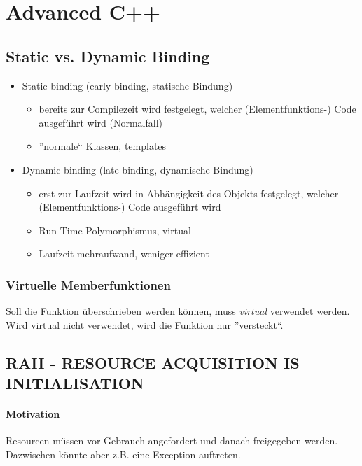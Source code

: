 \section{Advanced C++}

\subsection{Static vs. Dynamic Binding}
\begin{itemize}
	\item Static binding (early binding, statische Bindung)
		\begin{itemize}
			\item bereits zur Compilezeit wird festgelegt, welcher (Elementfunktions-) Code
				ausgeführt wird (Normalfall)
			\item ''normale`` Klassen, templates
		\end{itemize}
	\item Dynamic binding (late binding, dynamische Bindung)
		\begin{itemize}
			\item erst zur Laufzeit wird in Abhängigkeit des Objekts festgelegt, welcher
				(Elementfunktions-) Code ausgeführt wird
			\item Run-Time Polymorphismus, virtual
			\item Laufzeit mehraufwand, weniger effizient
		\end{itemize}
\end{itemize}

\subsubsection{Virtuelle Memberfunktionen}

Soll die Funktion überschrieben werden können, muss \emph{virtual} verwendet werden.
Wird virtual nicht verwendet, wird die Funktion nur ''versteckt``.



\subsection[RAII]{RAII - RESOURCE ACQUISITION IS INITIALISATION}

\paragraph{Motivation}
Resourcen müssen vor Gebrauch angefordert und danach freigegeben werden.
Dazwischen könnte aber z.B. eine Exception auftreten.

